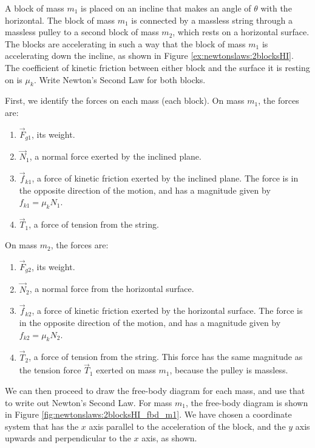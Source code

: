 \begin{example}{
A block of mass $m_1$ is placed on an incline that makes an angle of $\theta$ with the horizontal. The block of mass $m_1$ is connected by a massless string through a massless pulley to a second block of mass $m_2$, which rests on a horizontal surface. The blocks are accelerating in such a way that the block of mass $m_1$ is accelerating down the incline, as shown in Figure \ref{ex:newtonslaws:2blocksHI}. The coefficient of kinetic friction between either block and the surface it is resting on is $\mu_k$. Write Newton's Second Law for both blocks.}
\label{ex:newtonslaws:2blocksHI}

First, we identify the forces on each mass (each block). On mass $m_1$, the forces are:
\begin{enumerate}
\item $\vec F_{g1}$, its weight.
\item $\vec N_1$, a normal force exerted by the inclined plane.
\item $\vec f_{k1}$, a force of kinetic friction exerted by the inclined plane. The force is in the opposite direction of the motion, and has a magnitude given by $f_{k1}=\mu_kN_1$.
\item $\vec T_1$, a force of tension from the string. 
\end{enumerate}

On mass $m_2$, the forces are:

\begin{enumerate}
\item $\vec F_{g2}$, its weight.
\item $\vec N_2$, a normal force from the horizontal surface.
\item $\vec f_{k2}$, a force of kinetic friction exerted by the horizontal surface. The force is in the opposite direction of the motion, and has a magnitude given by $f_{k2}=\mu_kN_2$.
\item $\vec T_2$, a force of tension from the string. This force has the same magnitude as the tension force $\vec T_1$ exerted on mass $m_1$, because the pulley is massless. 
\end{enumerate}

We can then proceed to draw the free-body diagram for each mass, and use that to write out Newton's Second Law. For mass $m_1$, the free-body diagram is shown in Figure \ref{fig:newtonslaws:2blocksHI_fbd_m1}. We have chosen a coordinate system that has the $x$ axis parallel to the acceleration of the block, and the $y$ axis upwards and perpendicular to the $x$ axis, as shown. 


\end{example}
